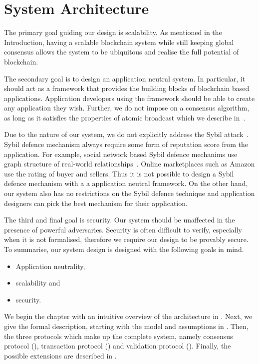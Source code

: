 \chapter{System Architecture}
\label{ch:model}

The primary goal guiding our design is scalability.
As mentioned in the Introduction, having a scalable blockchain system while still keeping global consensus
allows the system to be ubiquitous and realise the full potential of blockchain.

The secondary goal is to design an application neutral system.
In particular, it should act as a framework that provides the building blocks of blockchain based applications.
Application developers using the framework should be able to create any application they wish.
Further, we do not impose on a consensus algorithm, as long as it satisfies the properties of atomic broadcast which we describe in~.

Due to the nature of our system, we do not explicitly address the Sybil attack~\cite{douceur2002sybil}.
Sybil defence mechanism always require some form of reputation score from the application.
For example, social network based Sybil defence mechanims use graph structure of real-world relationships~\cite{yu2006sybilguard}.
Online marketplaces such as Amazon use the rating of buyer and sellers.
Thus it is not possible to design a Sybil defence mechanism with a a application neutral framework.
On the other hand, our system also has no restrictions on the Sybil defence technique
and application designers can pick the best mechanism for their application.

The third and final goal is security.
Our system should be unaffected in the presence of powerful adversaries.
Security is often difficult to verify, especially when it is not formalised, therefore we require our design to be provably secure.
To summarise, our system design is designed with the following goals in mind.
\begin{itemize}
    \item Application neutrality,
    \item scalability and
    \item security.
\end{itemize}

We begin the chapter with an intuitive overview of the architecture in .
Next, we give the formal description, starting with the model and assumptions in .
Then, the three protocols which make up the complete system,
namely consensus protocol (), transaction protocol () and validation protocol ().
Finally, the possible extensions are described in .


